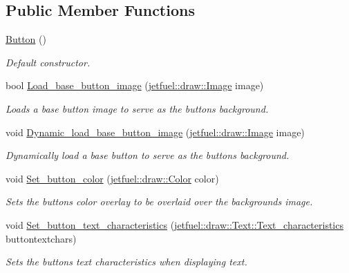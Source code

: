 \subsection*{Public Member Functions}
\begin{DoxyCompactItemize}
\item 
\hyperlink{classjetfuel_1_1gui_1_1Button_ad9fc0a1426f1fe03563ebac1c4ffcd92}{Button} ()
\begin{DoxyCompactList}\small\item\em Default constructor. \end{DoxyCompactList}\item 
bool \hyperlink{classjetfuel_1_1gui_1_1Button_a2c9b05aeec9661440c2bde16c6bdd791}{Load\+\_\+base\+\_\+button\+\_\+image} (\hyperlink{classjetfuel_1_1draw_1_1Image}{jetfuel\+::draw\+::\+Image} image)
\begin{DoxyCompactList}\small\item\em Loads a base button image to serve as the button\textquotesingle{}s background. \end{DoxyCompactList}\item 
void \hyperlink{classjetfuel_1_1gui_1_1Button_a452110801fca1b3274d574ebc671e8db}{Dynamic\+\_\+load\+\_\+base\+\_\+button\+\_\+image} (\hyperlink{classjetfuel_1_1draw_1_1Image}{jetfuel\+::draw\+::\+Image} image)
\begin{DoxyCompactList}\small\item\em Dynamically load a base button to serve as the button\textquotesingle{}s background. \end{DoxyCompactList}\item 
void \hyperlink{classjetfuel_1_1gui_1_1Button_a1d40cbd21c0c64b0a9c59b598536cce1}{Set\+\_\+button\+\_\+color} (\hyperlink{classjetfuel_1_1draw_1_1Color}{jetfuel\+::draw\+::\+Color} color)
\begin{DoxyCompactList}\small\item\em Sets the button\textquotesingle{}s color overlay to be overlaid over the background\textquotesingle{}s image. \end{DoxyCompactList}\item 
void \hyperlink{classjetfuel_1_1gui_1_1Button_ab2cf5dbf928df48a55118652e003519a}{Set\+\_\+button\+\_\+text\+\_\+characteristics} (\hyperlink{structjetfuel_1_1draw_1_1Text_1_1Text__characteristics}{jetfuel\+::draw\+::\+Text\+::\+Text\+\_\+characteristics} buttontextchars)
\begin{DoxyCompactList}\small\item\em Sets the button\textquotesingle{}s text characteristics when displaying text. \end{DoxyCompactList}\item 

\end{DoxyCompactItemize}
